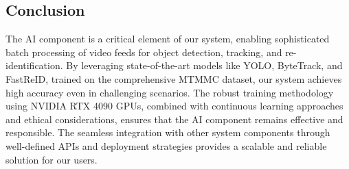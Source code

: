 \subsection{Conclusion}
\label{subsection:conclusion}

The AI component is a critical element of our system, enabling sophisticated batch processing of video feeds for object detection, tracking, and re-identification. By leveraging state-of-the-art models like YOLO, ByteTrack, and FastReID, trained on the comprehensive MTMMC dataset, our system achieves high accuracy even in challenging scenarios. The robust training methodology using NVIDIA RTX 4090 GPUs, combined with continuous learning approaches and ethical considerations, ensures that the AI component remains effective and responsible. The seamless integration with other system components through well-defined APIs and deployment strategies provides a scalable and reliable solution for our users.